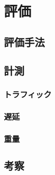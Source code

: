 \chapter{評価}
\label{chap:evaluation}
\section{評価手法}
\section{計測}
\subsection{トラフィック}
\subsection{遅延}
\subsection{重量}
\section{考察}
